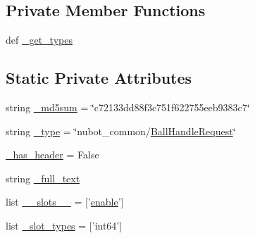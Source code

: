 \subsection*{Private Member Functions}
\begin{DoxyCompactItemize}
\item 
def \hyperlink{classnubot__common_1_1srv_1_1__BallHandle_1_1BallHandleRequest_af7d70bbd9e7efbe480b7bd242d227a5b}{\-\_\-get\-\_\-types}
\end{DoxyCompactItemize}
\subsection*{Static Private Attributes}
\begin{DoxyCompactItemize}
\item 
string \hyperlink{classnubot__common_1_1srv_1_1__BallHandle_1_1BallHandleRequest_ad8f8b414579cb96199912c7a63b82fbb}{\-\_\-md5sum} = \char`\"{}c72133dd88f3c751f622755eeb9383c7\char`\"{}
\item 
string \hyperlink{classnubot__common_1_1srv_1_1__BallHandle_1_1BallHandleRequest_a63be4374211860a9279e710e8a4ca729}{\-\_\-type} = \char`\"{}nubot\-\_\-common/\hyperlink{classnubot__common_1_1srv_1_1__BallHandle_1_1BallHandleRequest}{Ball\-Handle\-Request}\char`\"{}
\item 
\hyperlink{classnubot__common_1_1srv_1_1__BallHandle_1_1BallHandleRequest_a00f509c98087337eae179caeda30bc8a}{\-\_\-has\-\_\-header} = False
\item 
string \hyperlink{classnubot__common_1_1srv_1_1__BallHandle_1_1BallHandleRequest_a131b87b6696bd334b19384cb763fa012}{\-\_\-full\-\_\-text}
\item 
list \hyperlink{classnubot__common_1_1srv_1_1__BallHandle_1_1BallHandleRequest_a0f288e8bed73e8ba020c77501d298cda}{\-\_\-\-\_\-slots\-\_\-\-\_\-} = \mbox{[}'\hyperlink{classnubot__common_1_1srv_1_1__BallHandle_1_1BallHandleRequest_abfcbfca110adbedb7639ae12940532db}{enable}'\mbox{]}
\item 
list \hyperlink{classnubot__common_1_1srv_1_1__BallHandle_1_1BallHandleRequest_a1f9eb55b050dd255d02a29a801e75547}{\-\_\-slot\-\_\-types} = \mbox{[}'int64'\mbox{]}
\end{DoxyCompactItemize}



